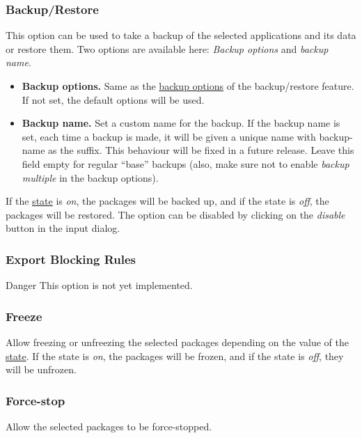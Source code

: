 \subsubsection{Backup/Restore} %
This option can be used to take a backup of the selected applications and its data or restore them.
Two options are available here: \textit{Backup options} and \textit{backup name}.
\begin{itemize}
    \item \textbf{Backup options.} Same as the \hyperref[subsec:backup-restore-backup-options]{backup options} of the
    backup/restore feature. If not set, the default options will be used.
    \item \textbf{Backup name.} Set a custom name for the backup. If the backup name is set, each time a backup is made,
    it will be given a unique name with backup-name as the suffix. This behaviour will be fixed in a future release.
    Leave this field empty for regular ``base'' backups (also, make sure not to enable \textit{backup multiple} in the
    backup options).
\end{itemize}

If the \hyperref[subsubsec:profile-state]{state} is \textit{on}, the packages will be backed up, and if the state is
\textit{off}, the packages will be restored. The option can be disabled by clicking on the \textit{disable} button in
the input dialog.

\subsubsection{Export Blocking Rules} %
\begin{danger}{Danger}
    This option is not yet implemented.
\end{danger}

\subsubsection{Freeze} %
Allow freezing or unfreezing the selected packages depending on the value of the \hyperref[subsubsec:profile-state]{state}.
If the state is \textit{on}, the packages will be frozen, and if the state is \textit{off}, they will be unfrozen.

\subsubsection{Force-stop} %
Allow the selected packages to be force-stopped.

